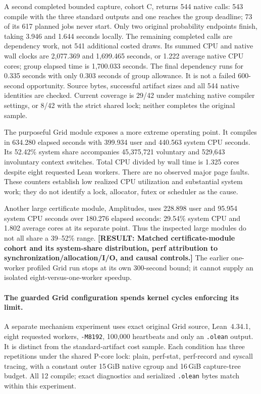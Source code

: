\documentclass[10pt,twocolumn]{article}
\newcommand{\missing}[1]{\textbf{[RESULT: #1]}}
\begin{document}
A second completed bounded capture, cohort C, returns 544 native calls:
543 compile with the three standard outputs and one reaches the group
deadline; 73 of its 617 planned jobs never start.
Only two original probability endpoints finish, taking 3.946 and
1.644 seconds locally. The remaining completed calls are dependency work,
not 541 additional costed draws.
Its summed CPU and native wall clocks are 2,077.369 and 1,699.465 seconds,
or 1.222 average native CPU cores; group elapsed time is 1,700.033 seconds.
The final dependency runs for 0.335 seconds with only 0.303 seconds of
group allowance. It is not a failed 600-second opportunity.
Source bytes, successful artifact sizes and all 544 native identities are
checked. Current coverage is 29/42 under matching native compiler settings,
or 8/42 with the strict shared lock; neither completes the original sample.


The purposeful Grid module exposes a more extreme operating point.
It compiles in 634.280 elapsed seconds with 399.934 user and 440.563
system CPU seconds. Its 52.42\% system share accompanies 45,375,721
voluntary and 529,643 involuntary context switches.
Total CPU divided by wall time is 1.325 cores despite eight requested Lean
workers. There are no observed major page faults.
These counters establish low realized CPU utilization and substantial
system work; they do not identify a lock, allocator, futex or scheduler
as the cause.

Another large certificate module, Amplitudes, uses 228.898 user and
95.954 system CPU seconds over 180.276 elapsed seconds:
29.54\% system CPU and 1.802 average cores at its separate point.
Thus the inspected large modules do not all share a 39--52\% range.
\missing{Matched certificate-module cohort and its system-share distribution,
perf attribution to synchronization/allocation/I/O, and causal controls.}
The earlier one-worker profiled Grid run stops at its own 300-second bound;
it cannot supply an isolated eight-versus-one-worker speedup.

\paragraph{The guarded Grid configuration spends kernel cycles enforcing its limit.}
A separate mechanism experiment uses exact original Grid source, Lean~4.34.1,
eight requested workers, \texttt{-M8192}, 100,000 heartbeats and only an
\texttt{.olean} output. It is distinct from the standard-artifact cost
sample. Each condition has three repetitions under the shared P-core lock:
plain, perf-stat, perf-record and syscall tracing, with a constant outer
15\,GiB native cgroup and 16\,GiB capture-tree budget.
All 12 compile; exact diagnostics and serialized \texttt{.olean} bytes
match within this experiment.
\end{document}

